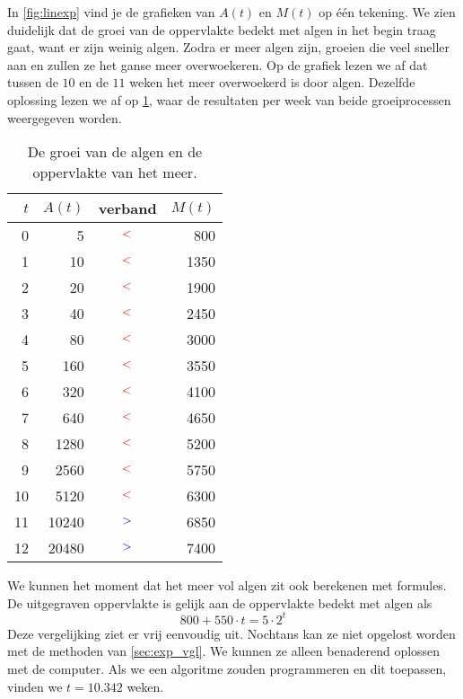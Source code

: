 In \cref{fig:linexp} vind je de grafieken van $A(t)$ en
$M(t)$ op \'{e}\'{e}n tekening. We zien duidelijk
dat de groei van de oppervlakte bedekt met algen
in het begin traag gaat, want er zijn weinig algen. Zodra
er meer algen zijn, groeien die veel sneller aan en zullen ze
het ganse meer overwoekeren. Op de grafiek lezen we af dat
tussen de $10$ en de $11$ weken het meer overwoekerd is door algen.
Dezelfde oplossing lezen we af op
\cref{tbl:meeralgen}, waar de resultaten per week van beide
groeiprocessen weergegeven worden.
\begin{table}[htb]
    \centering
    \caption{De groei van de algen en de oppervlakte van het meer.}
    \begin{tabular}{rrcr}
    \toprule
    $t$ & $A(t)$ & verband & $M(t)$  \\
    \midrule
    0 & 5 & ${\color{red}<}$ & 800  \\
    1 & 10 & ${\color{red}<}$ & 1350  \\
    2 & 20 & ${\color{red}<}$ & 1900  \\
    3 & 40 &  ${\color{red}<}$ & 2450  \\
    4 & 80 &  ${\color{red}<}$ & 3000  \\
    5 & 160 &  ${\color{red}<}$ & 3550  \\
    6 & 320 &  ${\color{red}<}$ & 4100  \\
    7 & 640 &  ${\color{red}<}$ & 4650  \\
    8 & 1280 &  ${\color{red}<}$ & 5200  \\
    9 & 2560 & ${\color{red}<}$ & 5750  \\
    10 & 5120 &  ${\color{red}<}$ & 6300  \\
    \cmidrule{2-4}
    11 & 10240 & ${\color{blue}>}$ & 6850  \\
    12 & 20480 & ${\color{blue}>}$ & 7400 \\
    \bottomrule
\end{tabular}
    \label{tbl:meeralgen}
\end{table}

We kunnen het moment dat het meer vol algen zit ook berekenen met formules. De uitgegraven oppervlakte is gelijk aan de oppervlakte bedekt met algen als
\begin{displaymath}
    800+550\cdot t=5\cdot 2^{t}
\end{displaymath}
Deze vergelijking ziet er vrij eenvoudig uit. Nochtans kan ze niet
opgelost worden met de methoden van \cref{sec:exp_vgl}.  We kunnen ze alleen
 benaderend oplossen met de computer. Als we een algoritme zouden programmeren en dit toepassen, vinden we $t=\num{10.342}$ weken. \\
 
